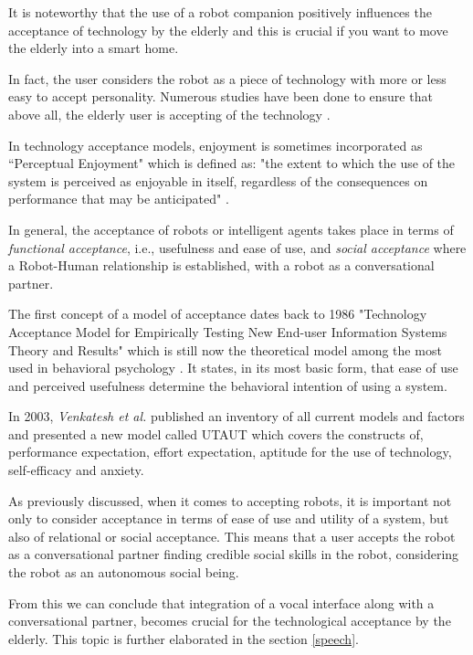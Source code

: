 \documentclass{thesisreport}
\begin{document}
 It is noteworthy that the use of a robot companion positively influences the acceptance of technology by the elderly and this is crucial if you want to move the elderly into a smart home.
 
 In fact, the user considers the robot as a piece of technology with more or less easy to accept personality.
 Numerous studies have been done to ensure that above all, the elderly user is accepting of the technology \cite{heerink2008influence, enjoymentModels,assistiveRobots}.
 
 In technology acceptance models, enjoyment is sometimes incorporated as ``Perceptual Enjoyment" which is defined as: "the extent to which the use of the system is perceived as enjoyable in itself, regardless of the consequences on performance that may be anticipated" \cite{enjoymentModels, davis1992extrinsic}.
 
 In general, the acceptance of robots or intelligent agents takes place in terms of \emph{functional acceptance}, i.e., usefulness and ease of use, and \emph{social acceptance} where a Robot-Human relationship is established, with a robot as  a conversational partner.
 
 The first concept of a model of acceptance dates back to 1986 "Technology Acceptance Model for Empirically Testing New End-user Information Systems Theory and Results" which is still now the theoretical model among the most used in behavioral psychology \cite{davis1985technology,enjoymentModels}.
 It states, in its most basic form, that ease of use and perceived usefulness determine the behavioral intention of using a system.
 
 In 2003, \textit{Venkatesh et al.} published an inventory of all current models and factors and presented a new model called UTAUT \cite{venkatesh2003user,enjoymentModels} which covers the constructs of, performance expectation, effort expectation, aptitude for the use of technology, self-efficacy and anxiety.
 
 As previously discussed, when it comes to accepting robots, it is important not only to consider acceptance in terms of ease of use and utility of a system, but also of relational or social acceptance. This means that a user accepts the robot as a conversational partner finding credible social skills in the robot, considering the robot as an autonomous social being. 
 
 From this we can conclude that integration of a vocal interface along with a conversational partner, becomes crucial for the technological acceptance by the elderly. This topic is further elaborated in the section \ref{speech}.
 
\end{document}
